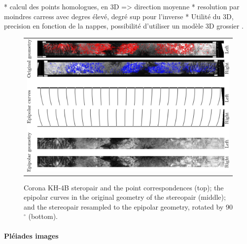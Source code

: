 \documentclass{ipol}
\begin{document}
    * calcul des points homologues, en 3D => direction moyenne
    * resolution par moindres carress avec degres élevé, degré sup pour l'inverse
    * Utilité du 3D, precision en fonction de la nappes, possibilité d'utiliser un modèle 3D grossier .


\begin{figure}[h!]
\centering
\begin{tabular}{c}
\includegraphics[width=14cm]{FIGS/ExpCorona_lowres.png}
\end{tabular}
\caption{Corona KH-4B steropair and the point correspondences (top); the epipolar curves in the original geometry of the stereopair (middle); and the stereopair resampled to the epipolar geometry, rotated by 90$^\circ$ (bottom).}
 
\label{ExpCorona}
\end{figure}
    
    
\paragraph{Pl\'eiades images}
\end{document}
